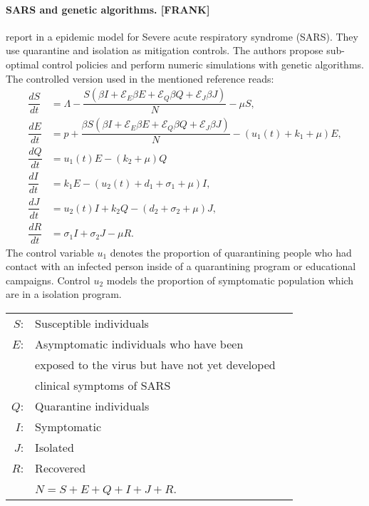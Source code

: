 \paragraph{SARS and genetic algorithms. [FRANK]}
\citeauthor{Yan2008} report in \cite{Yan2008} a epidemic model for
Severe acute respiratory syndrome (SARS). They use quarantine and isolation as
mitigation controls. The authors propose sub-optimal control policies and
perform numeric simulations with genetic algorithms. The
controlled version used in the mentioned reference reads:
%
%
\begin{equation}
	\begin{aligned}
		\dfrac{dS}{dt} &=
			\Lambda 
			-\dfrac{
				S
				\left(
					\beta I 
					+ \mathcal{E}_E  \beta E
					+ \mathcal{E}_Q  \beta Q
					+ \mathcal{E}_J  \beta J
				\right)
			}{N}
			- \mu S,
		\\
		\dfrac{dE}{dt} &=
			p +
			\dfrac{
				\beta S
				\left(
					\beta I 
						+ \mathcal{E}_E \beta E
						+ \mathcal{E}_Q \beta Q
						+ \mathcal{E}_J \beta J
				\right)
			}{N}
			-(
				u_1(t) + k_1 + \mu
			)E,
		\\
		\dfrac{dQ}{dt} &=
			u_1(t) E 
			- (k_2 + \mu) Q
		\\
		\dfrac{dI}{dt} &=
			k_1 E 
			-(u_2(t) + d_1  + \sigma_1 + \mu) I,
		\\
		\dfrac{dJ}{dt} &=
			u_2(t) I 
			+ k_2 Q
			- (d_2 + \sigma_2 + \mu) J,
		\\
		\dfrac{dR}{dt} &=
			\sigma_1 I
			+\sigma_2 J
			- \mu R.
	\end{aligned}
\end{equation}
The control variable $u_1$ denotes the proportion of quarantining people 
who had contact with an infected person inside of a quarantining program or
educational campaigns. Control $u_2$ models the proportion of symptomatic 
population which are in a isolation program.
\begin{table}
	\begin{center}
		\begin{tabular}{@{}rll@{}} 
			$S$: & Susceptible individuals 
			\\
			$E$: & Asymptomatic individuals who have been 
			\\
			   & exposed to the virus but have not yet developed 
			\\
			   & clinical symptoms of SARS 
			\\
			$Q$: & Quarantine individuals
			\\
			$I$: & Symptomatic 
			\\
			$J$: & Isolated
			\\
			$R$: & Recovered
			\\
				& $N = S + E + Q + I + J + R$.
		\end{tabular}
	\end{center}
\end{table}


